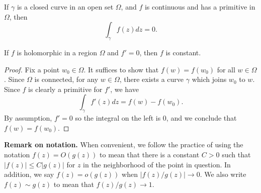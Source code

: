 \documentclass{exam}
\begin{document}
\noqed
\begin{corollary}
    If $\gamma$ is a closed curve in an open set $\Omega$, and $f$ is continuous and has a primitive in $\Omega$, then 
    $$\int_\gamma f(z) dz = 0.$$
\end{corollary}
\begin{corollary}
    If $f$ is holomorphic in a region $\Omega$ and $f' = 0$, then $f$ is constant.
\end{corollary}
\yesqed
\begin{proof}
    Fix a point $w_0\in\Omega$. It suffices to show that $f(w) = f(w_0)$ for all $w\in\Omega$. Since $\Omega$ is connected, for any $w\in\Omega$,
    there exists a curve $\gamma$ which joins $w_0$ to $w$. Since $f$ is clearly a primitive for $f'$, we have
    $$\int_\gamma f'(z)dz = f(w) - f(w_0).$$
    By assumption, $f' = 0$ so the integral on the left is 0, and we conclude that $f(w) = f(w_0)$.
\end{proof}

\textbf{Remark on notation. } When convenient, we follow the practice of using the notation $f(z) = O(g(z))$ to mean that there is a 
constant $C > 0$ such that $|f(z)| \leq C|g(z)|$ for $z$ in the neighborhood of the point in question. In addition, we say $f(z) = o(g(z))$
when $|f(z) / g(z)|\to 0$. We also write $f(z)\sim g(z)$ to mean that $f(z) / g(z)\to 1$. 
\end{document}
